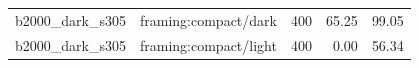 \begin{longtable}{l>{\raggedright\arraybackslash}p{.42\linewidth}rrr}
b2000\_\allowbreak{}dark\_\allowbreak{}s305 & %
framing:compact/dark & %
400 & %
65.25 & %
99.05 \\ %

b2000\_\allowbreak{}dark\_\allowbreak{}s305 & %
framing:compact/light & %
400 & %
0.00 & %
56.34 \\ %


\end{longtable}
